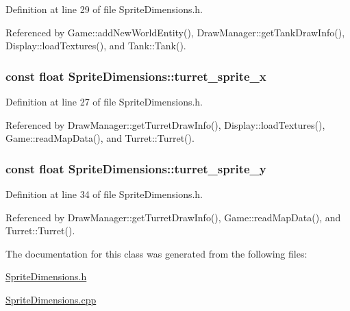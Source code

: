 Definition at line 29 of file Sprite\-Dimensions.\-h.



Referenced by Game\-::add\-New\-World\-Entity(), Draw\-Manager\-::get\-Tank\-Draw\-Info(), Display\-::load\-Textures(), and Tank\-::\-Tank().

\hypertarget{classSpriteDimensions_ad876e1e5dea420fe80462709c8ec2d5c}{
\subsubsection[{turret\-\_\-sprite\-\_\-x}]{\setlength{\rightskip}{0pt plus 5cm}const float Sprite\-Dimensions\-::turret\-\_\-sprite\-\_\-x}}\label{classSpriteDimensions_ad876e1e5dea420fe80462709c8ec2d5c}


Definition at line 27 of file Sprite\-Dimensions.\-h.



Referenced by Draw\-Manager\-::get\-Turret\-Draw\-Info(), Display\-::load\-Textures(), Game\-::read\-Map\-Data(), and Turret\-::\-Turret().

\hypertarget{classSpriteDimensions_a1b808c73bd915776ec6b8c10120adeae}{
\subsubsection[{turret\-\_\-sprite\-\_\-y}]{\setlength{\rightskip}{0pt plus 5cm}const float Sprite\-Dimensions\-::turret\-\_\-sprite\-\_\-y}}\label{classSpriteDimensions_a1b808c73bd915776ec6b8c10120adeae}


Definition at line 34 of file Sprite\-Dimensions.\-h.



Referenced by Draw\-Manager\-::get\-Turret\-Draw\-Info(), Game\-::read\-Map\-Data(), and Turret\-::\-Turret().



The documentation for this class was generated from the following files\-:\begin{DoxyCompactItemize}
\item 
\hyperlink{SpriteDimensions_8h}{Sprite\-Dimensions.\-h}\item 
\hyperlink{SpriteDimensions_8cpp}{Sprite\-Dimensions.\-cpp}\end{DoxyCompactItemize}
